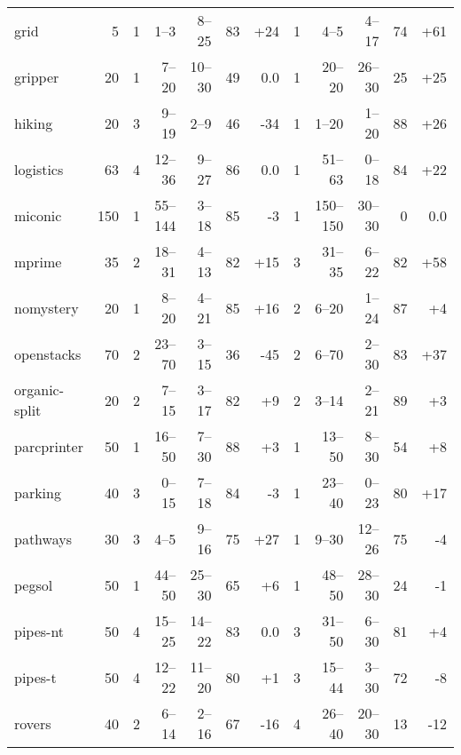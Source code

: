 \documentclass{article}
\begin{document}
\begin{table}
\begin{tabular}{l@{}rr|rrrr|r|rrrr}
         grid &     5 &   1 &    1--3 &  8--25 &  83 & {\color{blue}+24} &   1 &     4--5 &  4--17 &  74 & {\color{blue}+61} \\
      gripper &    20 &   1 &   7--20 & 10--30 &  49 &               0.0 &   1 &   20--20 & 26--30 &  25 & {\color{blue}+25} \\
       hiking &    20 &   3 &   9--19 &   2--9 &  46 &  {\color{red}-34} &   1 &    1--20 &  1--20 &  88 & {\color{blue}+26} \\
    logistics &    63 &   4 &  12--36 &  9--27 &  86 &               0.0 &   1 &   51--63 &  0--18 &  84 & {\color{blue}+22} \\
      miconic &   150 &   1 & 55--144 &  3--18 &  85 &   {\color{red}-3} &   1 & 150--150 & 30--30 &   0 &               0.0 \\
       mprime &    35 &   2 &  18--31 &  4--13 &  82 & {\color{blue}+15} &   3 &   31--35 &  6--22 &  82 & {\color{blue}+58} \\
    nomystery &    20 &   1 &   8--20 &  4--21 &  85 & {\color{blue}+16} &   2 &    6--20 &  1--24 &  87 &  {\color{blue}+4} \\
   openstacks &    70 &   2 &  23--70 &  3--15 &  36 &  {\color{red}-45} &   2 &    6--70 &  2--30 &  83 & {\color{blue}+37} \\
organic-split &    20 &   2 &   7--15 &  3--17 &  82 &  {\color{blue}+9} &   2 &    3--14 &  2--21 &  89 &  {\color{blue}+3} \\
  parcprinter &    50 &   1 &  16--50 &  7--30 &  88 &  {\color{blue}+3} &   1 &   13--50 &  8--30 &  54 &  {\color{blue}+8} \\
      parking &    40 &   3 &   0--15 &  7--18 &  84 &   {\color{red}-3} &   1 &   23--40 &  0--23 &  80 & {\color{blue}+17} \\
     pathways &    30 &   3 &    4--5 &  9--16 &  75 & {\color{blue}+27} &   1 &    9--30 & 12--26 &  75 &   {\color{red}-4} \\
       pegsol &    50 &   1 &  44--50 & 25--30 &  65 &  {\color{blue}+6} &   1 &   48--50 & 28--30 &  24 &   {\color{red}-1} \\
     pipes-nt &    50 &   4 &  15--25 & 14--22 &  83 &               0.0 &   3 &   31--50 &  6--30 &  81 &  {\color{blue}+4} \\
      pipes-t &    50 &   4 &  12--22 & 11--20 &  80 &  {\color{blue}+1} &   3 &   15--44 &  3--30 &  72 &   {\color{red}-8} \\
       rovers &    40 &   2 &   6--14 &  2--16 &  67 &  {\color{red}-16} &   4 &   26--40 & 20--30 &  13 &  {\color{red}-12} \\

\end{tabular}
\end{table}
\end{document}
